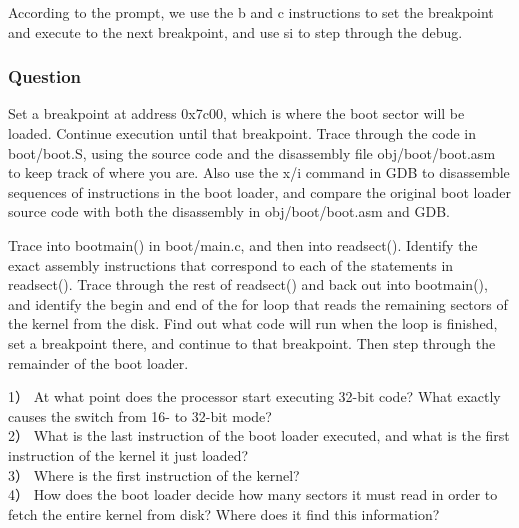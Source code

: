 According to the prompt, we use the b and c instructions to set the breakpoint and execute to the next breakpoint, and use si to step through the debug.

\subsubsection{Question }
Set a breakpoint at address 0x7c00, which is where the boot sector will be loaded. Continue execution until that breakpoint. Trace through the code in boot/boot.S, using the source code and the disassembly file obj/boot/boot.asm to keep track of where you are. Also use the x/i command in GDB to disassemble sequences of instructions in the boot loader, and compare the original boot loader source code with both the disassembly in obj/boot/boot.asm and GDB.

Trace into bootmain() in boot/main.c, and then into readsect(). Identify the exact assembly instructions that correspond to each of the statements in readsect(). Trace through the rest of readsect() and back out into bootmain(), and identify the begin and end of the for loop that reads the remaining sectors of the kernel from the disk. Find out what code will run when the loop is finished, set a breakpoint there, and continue to that breakpoint. Then step through the remainder of the boot loader.
\begin{flushleft}
1） At what point does the processor start executing 32-bit code? What exactly causes the switch from 16- to 32-bit mode?\\
2） What is the last instruction of the boot loader executed, and what is the first instruction of the kernel it just loaded?\\
3） Where is the first instruction of the kernel?\\
4） How does the boot loader decide how many sectors it must read in order to fetch the entire kernel from disk? Where does it find this
information?\\
\end{flushleft}

